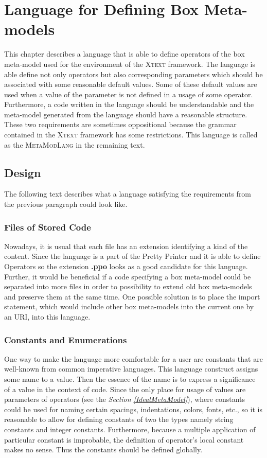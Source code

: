 \documentclass[12pt,notitlepage,a4paper]{report}
\begin{document}
\chapter {Language for Defining Box Meta-models}
\label{LanguageMetaModels}
This chapter  describes a language that is able to define operators of the box meta-model used for the environment of the \textsc{Xtext} framework. The language is able define not only operators but also corresponding parameters which should be associated with some reasonable default values. Some of these default values are used when a value of the parameter is not defined in a usage of some operator. Furthermore, a code written in the language should be understandable and the meta-model generated from the language should have a reasonable structure. These two requirements are sometimes oppositional because the grammar contained in the \textsc{Xtext} framework has some restrictions. This language is called as the \textsc{MetaModLang} in the remaining text. 

\section{Design}
The following text describes what a language satisfying the requirements from the previous paragraph could look like. 

\subsection{Files of Stored Code}
Nowadays, it is usual that each file has an extension identifying a kind of the content.  Since the language is a part of the Pretty Printer and it is able to define Operators so the extension \textbf{.ppo} looks as a good candidate for this language. Further, it would be beneficial if a code specifying a box meta-model could be separated into more files in order to possibility to extend old box meta-models and preserve them at the same time. One possible solution is to place the import statement, which would include other box meta-models into the current one by an URI, into this language.  

\subsection{Constants and Enumerations}
\label{ConstantsAndEnumerations}
One way to make the language more comfortable for a user are constants that are well-known from common imperative languages. This language construct assigns some name to a value. Then the essence of the name is to express a significance of a value in the context of code. Since the only place for usage of values are parameters of operators (see the \textit{Section \ref{IdealMetaModel}}), where constants could be used for naming certain spacings, indentations, colors, fonts, etc., so it is reasonable to allow for defining constants of two the types namely string constants and integer constants. Furthermore, because a multiple application of particular constant is improbable, the definition of operator's local constant makes no sense. Thus the constants should be defined globally.
\end{document}
